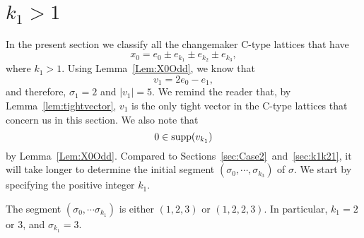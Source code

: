 \section{$k_1 > 1$}\label{sec:Case1}
In the present section we classify all the changemaker C-type lattices that have 
\[
x_0=e_0 \pm e_{k_1} \pm e_{k_2} \pm e_{k_3},
\]
where $k_1>1$. Using Lemma~\ref{Lem:X0Odd}, we know that
\begin{equation}\label{eq:v1}
v_1=2e_0 - e_1,
\end{equation}
and therefore, $\sigma_1 =2$ and $|v_1|=5$. We remind the reader that, by Lemma~\ref{lem:tightvector}, $v_1$ is the only tight vector in the C-type lattices that concern us in this section. We also note that 
\begin{equation}\label{eq:0inVk1}
0\in\operatorname{supp}(v_{k_1})
\end{equation}
 by Lemma~\ref{Lem:X0Odd}.
Compared to Sections~\ref{sec:Case2}~and~\ref{sec:k1k21}, it will take longer to determine the initial segment $(\sigma_0, \cdots, \sigma_{k_3})$ of $\sigma$. We start by specifying the positive integer $k_1$. 


\begin{lemma}\label{lem:k1>1,v2+t}
		The segment $(\sigma_0, \cdots \sigma_{k_1})$ is either $(1,2,3)$ or $(1,2,2,3)$. In particular, $k_1=2$ or $3$, and $\sigma_{k_1}=3$. 
\end{lemma}

